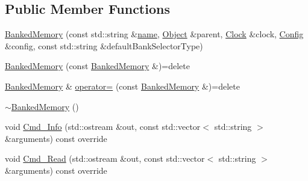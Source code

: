 \subsection*{Public Member Functions}
\begin{DoxyCompactItemize}
\item 
\hyperlink{class_simulator_1_1_banked_memory_a9e39b89e5156eac508430609c0ce7431}{Banked\+Memory} (const std\+::string \&\hyperlink{mtconf_8c_a8f8f80d37794cde9472343e4487ba3eb}{name}, \hyperlink{class_simulator_1_1_object}{Object} \&parent, \hyperlink{class_simulator_1_1_clock}{Clock} \&clock, \hyperlink{class_config}{Config} \&config, const std\+::string \&default\+Bank\+Selector\+Type)
\item 
\hyperlink{class_simulator_1_1_banked_memory_a1bd4b309f7e1115bab535d2bcad7ab9a}{Banked\+Memory} (const \hyperlink{class_simulator_1_1_banked_memory}{Banked\+Memory} \&)=delete
\item 
\hyperlink{class_simulator_1_1_banked_memory}{Banked\+Memory} \& \hyperlink{class_simulator_1_1_banked_memory_a2cd07d8ecd185069520454ccbb863226}{operator=} (const \hyperlink{class_simulator_1_1_banked_memory}{Banked\+Memory} \&)=delete
\item 
\hyperlink{class_simulator_1_1_banked_memory_a3e6d7eb6e0c0be8c79c07f50be5bb48a}{$\sim$\+Banked\+Memory} ()
\item 
void \hyperlink{class_simulator_1_1_banked_memory_af7759c840b89a7ac6184a8f3de02d8df}{Cmd\+\_\+\+Info} (std\+::ostream \&out, const std\+::vector$<$ std\+::string $>$ \&arguments) const override
\item 
void \hyperlink{class_simulator_1_1_banked_memory_a9cb8bc9b89c13e478e661b8672f79377}{Cmd\+\_\+\+Read} (std\+::ostream \&out, const std\+::vector$<$ std\+::string $>$ \&arguments) const override
\end{DoxyCompactItemize}
